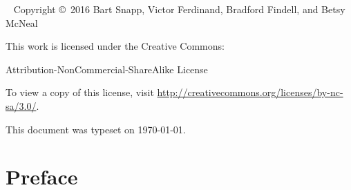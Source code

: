 

\newpage

\begin{fullwidth}
~\vfill
\thispagestyle{empty}
\setlength{\parindent}{0pt}
\setlength{\parskip}{\baselineskip}
Copyright \copyright~2016 Bart Snapp, Victor Ferdinand, Bradford Findell, and Betsy McNeal

\vspace{.5cm}

\noindent
This work is licensed under the Creative Commons:
\begin{center}
Attribution-NonCommercial-ShareAlike License 
\end{center}
To view a copy of this license, visit \url{http://creativecommons.org/licenses/by-nc-sa/3.0/}.


\vspace{.5cm}
\noindent This document was typeset on \today.
\end{fullwidth}



\chapter*{Preface}


